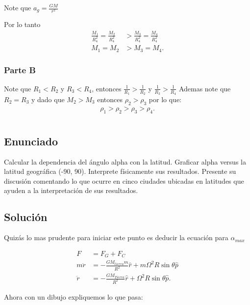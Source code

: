 \documentclass{report}
\begin{document}
Note que $a_g = \frac{GM}{r^2}$ 

Por lo tanto
\begin{align*}
  \frac{M_1}{R_4^2} = \frac{M_2}{R_4^2} &> \frac{M_3}{R_4^2} = \frac{M_4}{R_4^2}\\
  M_1 = M_2 &> M_3 = M_4
.\end{align*}

\subsection{Parte B}

Note que $R_1<R_2$ y $R_3<R_4$, entonces $\frac{1}{R_1}>\frac{1}{R_2}$ y $\frac{1}{R_3}>\frac{1}{R_4}$ Ademas note que $R_2=R_3$ y dado que $M_2>M_3$ entonces $\rho_2>\rho_3$ por lo que:
\begin{align*}
  \rho_1>\rho_2>\rho_3>\rho_4
.\end{align*}


\chapter{}

\section{Enunciado}

Calcular la dependencia del ángulo alpha con la latitud. Graficar alpha
versus la latitud geográfica (-90, 90). Interprete físicamente sus resultados.
Presente su discusión comentando lo que ocurre en cinco ciudades ubicadas en
latitudes que ayuden a la interpretación de sus resultados.

\section{Solución}

Quizás lo mas prudente para iniciar este punto es deducir la ecuación para $\alpha_{max}$

\begin{align*}
  F &= F_G + F_C \\
  m \ddot{r} &= - \frac{GM_{tierra} m}{R^2} \hat{r} + m \Omega^2 R \sin\theta \hat{p} \\
  \ddot{r} &= - \frac{GM_{Tierra}}{R^2} \hat{r} + \Omega^2 R\sin\theta \hat{p} 
.\end{align*}

Ahora con un dibujo expliquemos lo que pasa:
\end{document}
